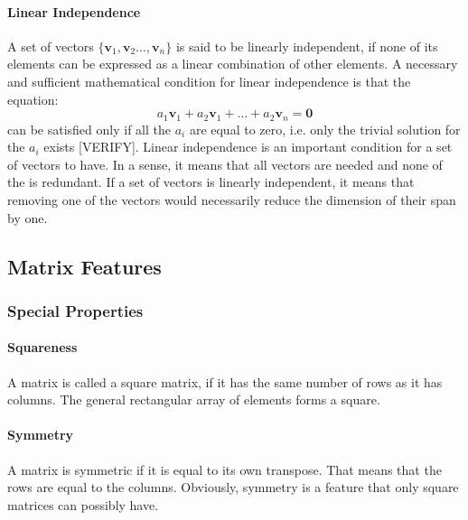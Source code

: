 \paragraph{Linear Independence}
A set of vectors $\{\mathbf{v}_1, \mathbf{v}_2 \ldots, \mathbf{v}_n \}$ is said to be linearly independent, if none of its elements can be expressed as a linear combination of other elements. A necessary and sufficient mathematical condition for linear independence is that the equation:
\begin{equation}
 a_1 \mathbf{v}_1 + a_2 \mathbf{v}_1  + \ldots + a_2 \mathbf{v}_n = \mathbf{0}
\end{equation}
can be satisfied only if all the $a_i$ are equal to zero, i.e. only the trivial solution for the $a_i$ exists [VERIFY]. Linear independence is an important condition for a set of vectors to have. In a sense, it means that all vectors are needed and none of the is redundant. If a set of vectors is linearly independent, it means that removing one of the vectors would necessarily reduce the dimension of their span by one.



\subsection{Matrix Features}


\subsubsection{Special Properties}

\paragraph{Squareness}
A matrix is called a square matrix, if it has the same number of rows as it has columns. The general rectangular array of elements forms a square.

\paragraph{Symmetry}
A matrix is symmetric if it is equal to its own transpose. That means that the rows are equal to the columns. Obviously, symmetry is a feature that only square matrices can possibly have.

